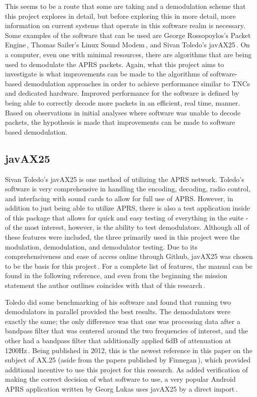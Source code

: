 This seems to be a route that some are taking and a demodulation scheme that this project explores in detail, but before exploring this in more detail, more information on current systems that operate in this software realm is necessary. Some examples of the software that can be used are George Rossopoylos's Packet Engine\,\cite{Rossopoylos}, Thomas Sailer's Linux Sound Modem\,\cite{Sailer1997,Sailer2000}, and Sivan Toledo's javAX25\,\cite{javax25github, Toledo2012a}. On a computer, even one with minimal resources, there are algorithms that are being used to demodulate the APRS packets. Again, what this project aims to investigate is what improvements can be made to the algorithms of software-based demodulation approaches in order to achieve performance similar to TNCs and dedicated hardware. Improved performance for the software is defined by being able to correctly decode more packets in an efficient, real time, manner. Based on observations in initial analyses where software was unable to decode packets, the hypothesis is made that improvements can be made to software based demodulation.

\subsection{javAX25}
Sivan Toledo's javAX25 is one method of utilizing the APRS network. Toledo's software is very comprehensive in handling the encoding, decoding, radio control, and interfacing with sound cards to allow for full use of APRS. However, in addition to just being able to utilize APRS, there is also a test application inside of this package that allows for quick and easy testing of everything in the suite - of the most interest, however, is the ability to test demodulators. Although all of these features were included, the three primarily used in this project were the modulation, demodulation, and demodulator testing. Due to its comprehensiveness and ease of access online through Github, javAX25 was chosen to be the basis for this project\,\cite{javax25github}. For a complete list of features, the manual can be found in the following reference, and even from the beginning the mission statement the author outlines coincides with that of this research\,\cite{Toledo2012a}.

Toledo did some benchmarking of his software and found that running two demodulators in parallel provided the best results. The demodulators were exactly the same; the only difference was that one was processing data after a bandpass filter that was centered around the two frequencies of interest, and the other had a bandpass filter that additionally applied 6dB of attenuation at 1200Hz\,\cite{Toledo2012}. Being published in 2012, this is the newest reference in this paper on the subject of AX.25 (aside from the papers published by Finnegan\,\cite{KWFThesis, KWFTAPR}), which provided additional incentive to use this project for this research. As added verification of making the correct decision of what software to use, a very popular Android APRS application written by Georg Lukas uses javAX25 by a direct import\,\cite{APRSdroid}.